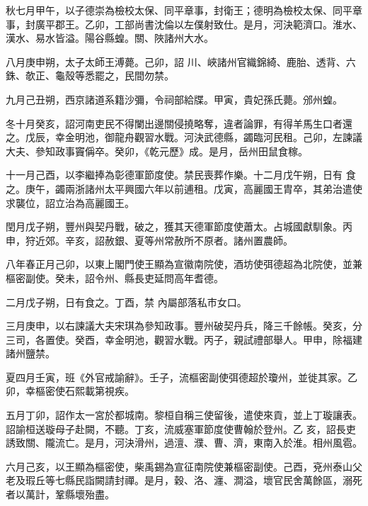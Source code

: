 \begin{pinyinscope}
 秋七月甲午，以子德崇為檢校太保、同平章事，封衛王；德明為檢校太保、同平章事，封廣平郡王。乙卯，工部尚書沈倫以左僕射致仕。是月，河決範濟口。淮水、漢水、易水皆溢。陽谷縣蝗。關、陜諸州大水。



 八月庚申朔，太子太師王溥薨。己卯，詔
 川、峽諸州官織錦綺、鹿胎、透背、六銖、欹正、龜殼等悉罷之，民間勿禁。



 九月己丑朔，西京諸道系籍沙彌，令祠部給牒。甲寅，貴妃孫氏薨。邠州蝗。



 冬十月癸亥，詔河南吏民不得闌出邊關侵撓略奪，違者論罪，有得羊馬生口者還之。戊辰，幸金明池，御龍舟觀習水戰。河決武德縣，蠲臨河民租。己卯，左諫議大夫、參知政事竇偁卒。癸卯，《乾元歷》成。是月，岳州田鼠食稼。



 十一月己酉，以李繼捧為彰德軍節度使。禁民喪葬作樂。十二月戊午朔，日有
 食之。庚午，蠲兩浙諸州太平興國六年以前逋租。戊寅，高麗國王胄卒，其弟治遣使求襲位，詔立治為高麗國王。



 閏月戊子朔，豐州與契丹戰，破之，獲其天德軍節度使蕭太。占城國獻馴象。丙申，狩近郊。辛亥，詔赦銀、夏等州常赦所不原者。諸州置農師。



 八年春正月己卯，以東上閣門使王顯為宣徽南院使，酒坊使弭德超為北院使，並兼樞密副使。癸未，詔令州、縣長吏延問高年耆德。



 二月戊子朔，日有食之。丁酉，禁
 內屬部落私市女口。



 三月庚申，以右諫議大夫宋琪為參知政事。豐州破契丹兵，降三千餘帳。癸亥，分三司，各置使。癸酉，幸金明池，觀習水戰。丙子，親試禮部舉人。甲申，除福建諸州鹽禁。



 夏四月壬寅，班《外官戒諭辭》。壬子，流樞密副使弭德超於瓊州，並徙其家。乙卯，幸樞密使石熙載第視疾。



 五月丁卯，詔作太一宮於都城南。黎桓自稱三使留後，遣使來貢，並上丁璇讓表。詔諭桓送璇母子赴闕，不聽。丁亥，流威塞軍節度使曹翰於登州。乙
 亥，詔長吏誘致關、隴流亡。是月，河決滑州，過澶、濮、曹、濟，東南入於淮。相州風雹。



 六月己亥，以王顯為樞密使，柴禹錫為宣征南院使兼樞密副使。己酉，兗州泰山父老及瑕丘等七縣民詣闕請封禪。是月，穀、洛、瀍、澗溢，壞官民舍萬餘區，溺死者以萬計，鞏縣壞殆盡。




\end{pinyinscope}
